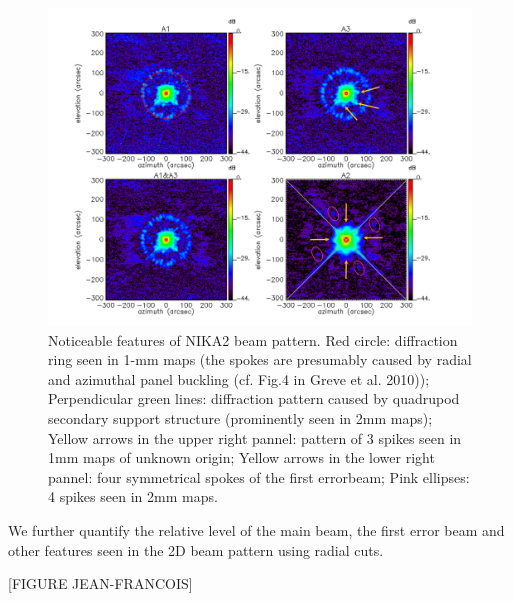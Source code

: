 \begin{figure}
\begin{center}
  \includegraphics[clip, angle=0, scale=0.4]{Figures/Beams_features.pdf}
\caption{Noticeable features of NIKA2 beam pattern. Red circle: diffraction ring seen in 1-mm maps (the spokes are presumably caused by radial and azimuthal panel buckling (cf. Fig.4 in Greve et al. 2010)); Perpendicular green lines: diffraction pattern caused by quadrupod secondary support structure (prominently seen in 2mm maps); Yellow arrows in the upper right pannel: pattern of 3 spikes seen in 1mm maps of unknown origin; Yellow arrows in the lower right pannel: four symmetrical spokes of the first errorbeam; Pink ellipses: 4 spikes seen in 2mm maps.}
\label{fig:features}
\end{center}
\end{figure}

We further quantify the relative level of the main beam, the first error beam and other features seen in the 2D beam pattern using radial cuts.

[FIGURE JEAN-FRANCOIS]

